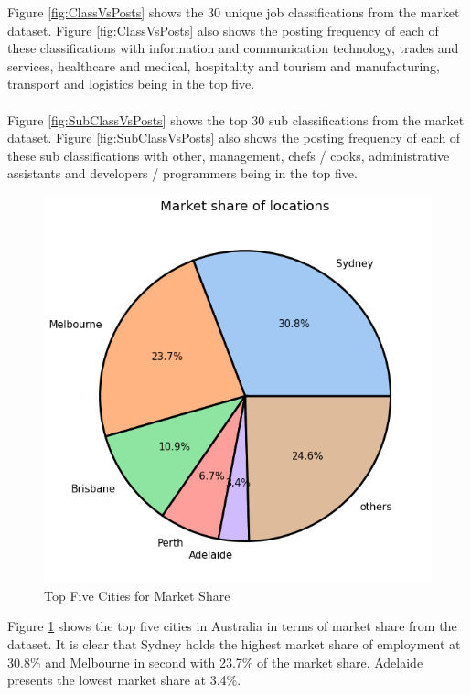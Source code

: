 \documentclass[twoside, 12pt, a4paper]{article}
\begin{document}
\newpage 
Figure \ref{fig:ClassVsPosts} shows the 30 unique job classifications from the market dataset. Figure \ref{fig:ClassVsPosts} also shows the posting frequency of each of these classifications with information and communication technology, trades and services, healthcare and medical, hospitality and tourism and manufacturing, transport and logistics being in the top five.\\\\
Figure \ref{fig:SubClassVsPosts} shows the top 30 sub classifications from the market dataset. Figure \ref{fig:SubClassVsPosts} also shows the posting frequency of each of these sub classifications with other, management, chefs / cooks, administrative assistants and developers / programmers being in the top five. 

\begin{figure}[h!]
	\centering
	\includegraphics[scale = 0.58]{TopCities.png}
	\caption{Top Five Cities for Market Share}
	\label{fig:TopFiveCities}
\end{figure}

Figure \ref{fig:TopFiveCities} shows the top five cities in Australia in terms of market share from the dataset. It is clear that Sydney holds the highest market share of employment at 30.8\% and Melbourne in second with 23.7\% of the market share. Adelaide presents the lowest market share at 3.4\%. 
\end{document}
